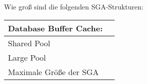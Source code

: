       \item Wie groß sind die folgenden SGA-Strukturen:
        \begin{center}
          \begin{small}
            \tabletail{
              \hline
            }
            \tablelasttail {
              \hline
            }
            \begin{supertabular}{|l|p{3cm}|}
            Database Buffer Cache: & \\
            \hline
            Shared Pool & \\
            \hline
            Large Pool & \\
            \hline
            Maximale Größe der SGA & \\
           \end{supertabular}
          \end{small}
        \end{center}
